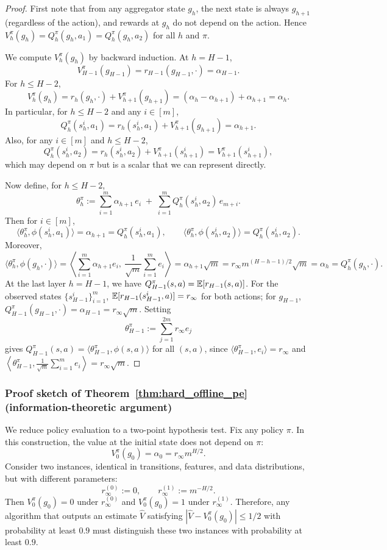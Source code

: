 \begin{proof}
First note that from any aggregator state $g_h$, the next state is always $g_{h+1}$
(regardless of the action), and rewards at $g_h$ do not depend on the action. Hence
$V_h^\pi(g_h)=Q_h^\pi(g_h,a_1)=Q_h^\pi(g_h,a_2)$ for all $h$ and $\pi$.

We compute $V_h^\pi(g_h)$ by backward induction.  At $h=H-1$,
\[
V_{H-1}^\pi(g_{H-1}) = r_{H-1}(g_{H-1},\cdot)=\alpha_{H-1}.
\]
For $h\le H-2$,
\[
V_h^\pi(g_h)
= r_h(g_h,\cdot) + V_{h+1}^\pi(g_{h+1})
= (\alpha_h-\alpha_{h+1}) + \alpha_{h+1}
= \alpha_h.
\]
In particular, for $h\le H-2$ and any $i\in[m]$,
\[
Q_h^\pi(s_h^i,a_1)
= r_h(s_h^i,a_1) + V_{h+1}^\pi(g_{h+1})
= \alpha_{h+1}.
\]
Also, for any $i\in[m]$ and $h\le H-2$,
\[
Q_h^\pi(s_h^i,a_2)
= r_h(s_h^i,a_2) + V_{h+1}^\pi(s_{h+1}^i)
= V_{h+1}^\pi(s_{h+1}^i),
\]
which may depend on $\pi$ but is a scalar that we can represent directly.

Now define, for $h\le H-2$,
\[
\theta_h^\pi
:= \sum_{i=1}^m \alpha_{h+1}\,e_i
\;+\; \sum_{i=1}^m Q_h^\pi(s_h^i,a_2)\, e_{m+i}.
\]
Then for $i\in[m]$,
\[
\langle \theta_h^\pi,\phi(s_h^i,a_1)\rangle = \alpha_{h+1} = Q_h^\pi(s_h^i,a_1),
\qquad
\langle \theta_h^\pi,\phi(s_h^i,a_2)\rangle = Q_h^\pi(s_h^i,a_2).
\]
Moreover,
\[
\langle \theta_h^\pi,\phi(g_h,\cdot)\rangle
= \left\langle \sum_{i=1}^m \alpha_{h+1}e_i,\ \frac{1}{\sqrt{m}}\sum_{i=1}^m e_i \right\rangle
= \alpha_{h+1}\sqrt{m}
= r_\infty m^{(H-h-1)/2}\sqrt{m}
= \alpha_h
= Q_h^\pi(g_h,\cdot).
\]
At the last layer $h=H-1$, we have $Q_{H-1}^\pi(s,a)=\mathbb{E}[r_{H-1}(s,a)]$.  For the
observed states $\{s_{H-1}^i\}_{i=1}^m$, $\mathbb{E}[r_{H-1}(s_{H-1}^i,a)]=r_\infty$ for
both actions; for $g_{H-1}$, $Q_{H-1}^\pi(g_{H-1},\cdot)=\alpha_{H-1}=r_\infty\sqrt{m}$.
Setting
\[
\theta_{H-1}^\pi := \sum_{j=1}^{2m} r_\infty e_j
\]
gives $Q_{H-1}^\pi(s,a)=\langle \theta_{H-1}^\pi,\phi(s,a)\rangle$ for all $(s,a)$,
since $\langle \theta_{H-1}^\pi,e_i\rangle=r_\infty$ and
$\left\langle \theta_{H-1}^\pi,\frac{1}{\sqrt{m}}\sum_{i=1}^m e_i\right\rangle
= r_\infty\sqrt{m}$.
\end{proof}


\subsubsection*{Proof sketch of Theorem~\ref{thm:hard_offline_pe} (information-theoretic argument)}
We reduce policy evaluation to a two-point hypothesis test.
Fix any policy $\pi$.  In this construction, the value at the initial state does
not depend on $\pi$:
\[
V_0^\pi(g_0)=\alpha_0=r_\infty m^{H/2}.
\]
Consider two instances, identical in transitions, features, and data distributions,
but with different parameters:
\[
r_\infty^{(0)} := 0,
\qquad
r_\infty^{(1)} := m^{-H/2}.
\]
Then $V_0^\pi(g_0)=0$ under $r_\infty^{(0)}$ and $V_0^\pi(g_0)=1$ under
$r_\infty^{(1)}$.  Therefore, any algorithm that outputs an estimate
$\widehat{V}$ satisfying $|\widehat{V}-V_0^\pi(g_0)|\le 1/2$ with probability at
least $0.9$ must distinguish these two instances with probability at least $0.9$.

